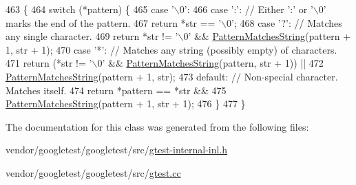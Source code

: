 \begin{DoxyCode}
463                                                             \{
464   \textcolor{keywordflow}{switch} (*pattern) \{
465     \textcolor{keywordflow}{case} \textcolor{charliteral}{'\(\backslash\)0'}:
466     \textcolor{keywordflow}{case} \textcolor{charliteral}{':'}:  \textcolor{comment}{// Either ':' or '\(\backslash\)0' marks the end of the pattern.}
467       \textcolor{keywordflow}{return} *str == \textcolor{charliteral}{'\(\backslash\)0'};
468     \textcolor{keywordflow}{case} \textcolor{charliteral}{'?'}:  \textcolor{comment}{// Matches any single character.}
469       \textcolor{keywordflow}{return} *str != \textcolor{charliteral}{'\(\backslash\)0'} && \hyperlink{classtesting_1_1internal_1_1UnitTestOptions_af0235a2ee26dd6db21305e11d2358e4f}{PatternMatchesString}(pattern + 1, str + 1);
470     \textcolor{keywordflow}{case} \textcolor{charliteral}{'*'}:  \textcolor{comment}{// Matches any string (possibly empty) of characters.}
471       \textcolor{keywordflow}{return} (*str != \textcolor{charliteral}{'\(\backslash\)0'} && \hyperlink{classtesting_1_1internal_1_1UnitTestOptions_af0235a2ee26dd6db21305e11d2358e4f}{PatternMatchesString}(pattern, str + 1)) ||
472           \hyperlink{classtesting_1_1internal_1_1UnitTestOptions_af0235a2ee26dd6db21305e11d2358e4f}{PatternMatchesString}(pattern + 1, str);
473     \textcolor{keywordflow}{default}:  \textcolor{comment}{// Non-special character.  Matches itself.}
474       \textcolor{keywordflow}{return} *pattern == *str &&
475           \hyperlink{classtesting_1_1internal_1_1UnitTestOptions_af0235a2ee26dd6db21305e11d2358e4f}{PatternMatchesString}(pattern + 1, str + 1);
476   \}
477 \}
\end{DoxyCode}


The documentation for this class was generated from the following files\+:\begin{DoxyCompactItemize}
\item 
vendor/googletest/googletest/src/\hyperlink{gtest-internal-inl_8h}{gtest-\/internal-\/inl.\+h}\item 
vendor/googletest/googletest/src/\hyperlink{gtest_8cc}{gtest.\+cc}\end{DoxyCompactItemize}
